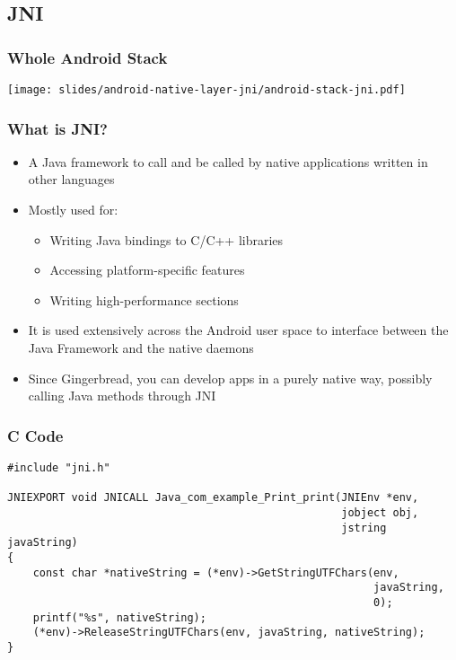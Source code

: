 \subsection{JNI}

\begin{frame}
  \frametitle{Whole Android Stack}
  \begin{center}
    \texttt{[image: slides/android-native-layer-jni/android-stack-jni.pdf]}
  \end{center}
\end{frame}

\begin{frame}
  \frametitle{What is JNI?}
  \begin{itemize}
  \item A Java framework to call and be called by native applications
    written in other languages
  \item Mostly used for:
    \begin{itemize}
    \item Writing Java bindings to C/C++ libraries
    \item Accessing platform-specific features
    \item Writing high-performance sections
    \end{itemize}
  \item It is used extensively across the Android user space to
    interface between the Java Framework and the native daemons
  \item Since Gingerbread, you can develop apps in a purely native
    way, possibly calling Java methods through JNI
  \end{itemize}
\end{frame}

\begin{frame}[fragile]
  \frametitle{C Code}
\begin{verbatim}
#include "jni.h"

JNIEXPORT void JNICALL Java_com_example_Print_print(JNIEnv *env,
                                                    jobject obj,
                                                    jstring javaString)
{
    const char *nativeString = (*env)->GetStringUTFChars(env,
                                                         javaString,
                                                         0);
    printf("%s", nativeString);
    (*env)->ReleaseStringUTFChars(env, javaString, nativeString);
}
\end{verbatim}
\end{frame}

